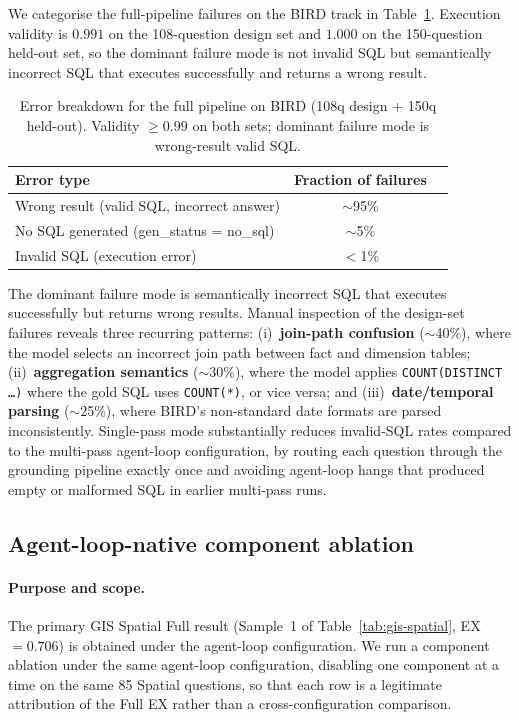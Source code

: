 \documentclass[11pt]{article}
\begin{document}
We categorise the full-pipeline failures on the BIRD track in Table~\ref{tab:errors}. Execution validity is $0.991$ on the 108-question design set and $1.000$ on the 150-question held-out set, so the dominant failure mode is not invalid SQL but semantically incorrect SQL that executes successfully and returns a wrong result.

\begin{table}[t]
\centering
\caption{Error breakdown for the full pipeline on BIRD (108q design + 150q held-out). Validity $\geq 0.99$ on both sets; dominant failure mode is wrong-result valid SQL.}
\label{tab:errors}
\begin{tabular}{lcc}
\toprule
Error type & Fraction of failures \\
\midrule
Wrong result (valid SQL, incorrect answer) & $\sim$95\% \\
No SQL generated (gen\_status = no\_sql)    & $\sim$5\% \\
Invalid SQL (execution error)              & $<$1\% \\
\bottomrule
\end{tabular}
\end{table}

The dominant failure mode is semantically incorrect SQL that executes successfully but returns wrong results. Manual inspection of the design-set failures reveals three recurring patterns: (i)~\textbf{join-path confusion} ($\sim$40\%), where the model selects an incorrect join path between fact and dimension tables; (ii)~\textbf{aggregation semantics} ($\sim$30\%), where the model applies \texttt{COUNT(DISTINCT \dots)} where the gold SQL uses \texttt{COUNT(*)}, or vice versa; and (iii)~\textbf{date/temporal parsing} ($\sim$25\%), where BIRD's non-standard date formats are parsed inconsistently. Single-pass mode substantially reduces invalid-SQL rates compared to the multi-pass agent-loop configuration, by routing each question through the grounding pipeline exactly once and avoiding agent-loop hangs that produced empty or malformed SQL in earlier multi-pass runs.

\subsection{Agent-loop-native component ablation}
\label{sec:ablation}

\paragraph{Purpose and scope.} The primary GIS Spatial Full result (Sample~1 of Table~\ref{tab:gis-spatial}, EX$=0.706$) is obtained under the agent-loop configuration. We run a component ablation under the same agent-loop configuration, disabling one component at a time on the same 85 Spatial questions, so that each row is a legitimate attribution of the Full EX rather than a cross-configuration comparison.
\end{document}
